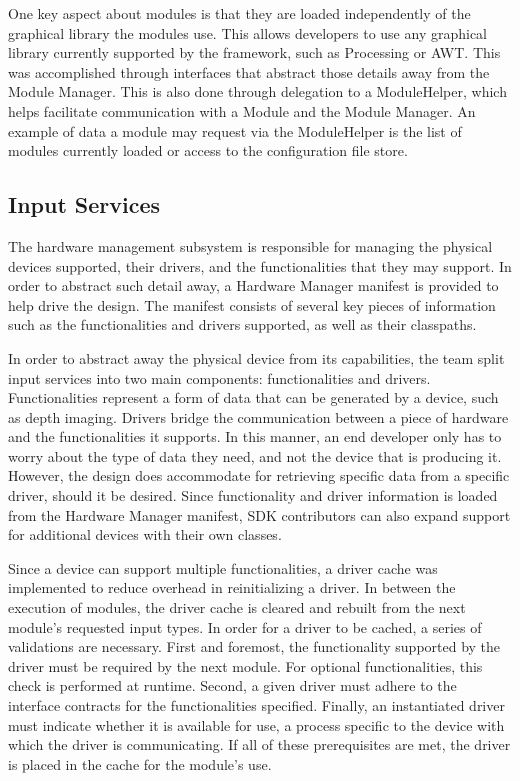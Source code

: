 \documentclass[11pt,letterpaper]{article}
\begin{document}
	One key aspect about modules is that they are loaded independently of the 
	graphical library the modules use. This allows developers to use any 
	graphical library currently supported by the framework, such as Processing 
	or AWT.  This was accomplished through interfaces that abstract those 
	details away from the Module Manager.  This is also done through 
	delegation to a ModuleHelper, which helps facilitate communication with a 
	Module and the Module Manager. An example of data a module may request via 
	the ModuleHelper is the list of modules currently loaded or access to the 
	configuration file store.

	\subsection{Input Services}

	The hardware management subsystem is responsible for managing the physical 
	devices supported, their drivers, and the functionalities that they may 
	support. In order to abstract such detail away, a Hardware Manager 
	manifest is provided to help drive the design. The manifest consists of 
	several key pieces of information such as the functionalities and drivers 
	supported, as well as their classpaths.

	In order to abstract away the physical device from its capabilities, the 
	team split input services into two main components: functionalities and 
	drivers. Functionalities represent a form of data that can be generated by 
	a device, such as depth imaging. Drivers bridge the communication between 
	a piece of hardware and the functionalities it supports. In this manner, 
	an end developer only has to worry about the type of data they need, and 
	not the device that is producing it. However, the design does accommodate 
	for retrieving specific data from a specific driver, should it be desired. 
	Since functionality and driver information is loaded from the Hardware 
	Manager manifest, SDK contributors can also expand support for additional 
	devices with their own classes.

	Since a device can support multiple functionalities, a driver cache was 
	implemented to reduce overhead in reinitializing a driver. In between the 
	execution of modules, the driver cache is cleared and rebuilt from the 
	next module's requested input types. In order for a driver to be cached, a 
	series of validations are necessary. First and foremost, the functionality 
	supported by the driver must be required by the next module. For 
	optional functionalities, this check is performed at runtime. Second, a 
	given driver must adhere to the interface contracts for the 
	functionalities specified. Finally, an instantiated driver must indicate 
	whether it is available for use, a process specific to the device with 
	which the driver is communicating. If all of these prerequisites are met, 
	the driver is placed in the cache for the module's use. 
\end{document}

